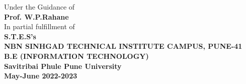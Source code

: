 \begin{titlepage}
\begin{center}
\vspace{5mm}
Under the Guidance of \\
\textbf{ Prof. W.P.Rahane } \\
\vspace{5mm}
In partial fulfillment of \\
\textbf{S.T.E.S’s} \\
\vspace*{0.2cm}
\textbf{NBN SINHGAD TECHNICAL INSTITUTE CAMPUS, PUNE-41} \\
\textbf{B.E (INFORMATION TECHNOLOGY)} \\
\textbf{\Large Savitribai Phule Pune University} \\
\textbf{May-June 2022-2023}\\
\end{center}

\end{titlepage}

\clearpage

